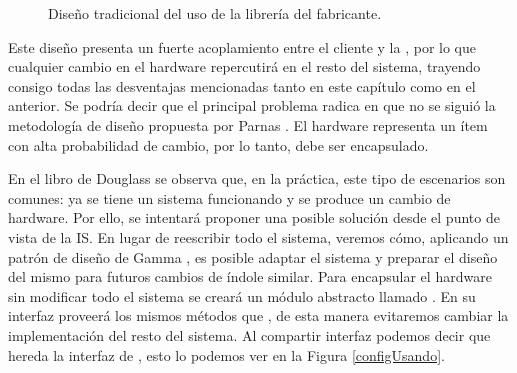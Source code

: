 \begin{figure}[H]
\caption{Diseño tradicional del uso de la librería del fabricante.}
\label{configOri}
\begin{center}
\end{center}
\end{figure}


Este diseño presenta un fuerte acoplamiento entre el cliente y la \LibAcme, por lo que cualquier cambio en el hardware repercutirá en el resto del sistema, trayendo consigo todas las desventajas mencionadas tanto en este capítulo como en el anterior. Se podría decir que el principal problema radica en que no se siguió la metodología de diseño propuesta por Parnas \cite{Parnas1972}. El hardware representa un ítem con alta probabilidad de cambio, por lo tanto, debe ser encapsulado.

En el libro de Douglass \cite{douglass} se observa que, en la práctica, este tipo de escenarios son comunes: ya se tiene un sistema funcionando y se produce un cambio de hardware. Por ello, se intentará proponer una posible solución desde el punto de vista de la \gls{IS}. En lugar de reescribir todo el sistema, veremos cómo, aplicando un patrón de diseño de Gamma \cite{Gamma:1995:DPE:186897}, es posible adaptar el sistema y preparar el diseño del mismo para futuros cambios de índole similar.
Para encapsular el hardware sin modificar todo el sistema se creará un módulo abstracto llamado \Display. En su interfaz proveerá los mismos métodos que \LibAcme, de esta manera evitaremos cambiar la implementación del resto del sistema. Al compartir interfaz podemos decir que \LibAcme hereda la interfaz de \Display, esto lo podemos ver en la Figura \ref{configUsando}.

